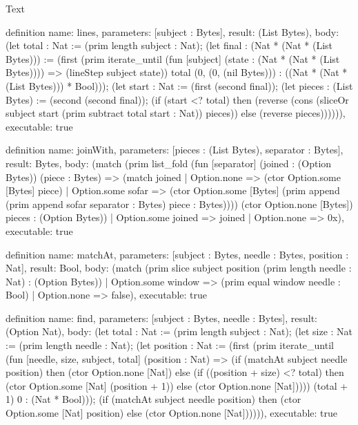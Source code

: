 \begin{lexlean}{Text}
\begin{semanticmodule}
definition{
  name: lines,
  parameters: [subject : Bytes],
  result: (List Bytes),
  body: (let total : Nat := (prim length subject : Nat); (let final : (Nat * (Nat * (List Bytes))) := (first (prim iterate_until (fun [subject] (state : (Nat * (Nat * (List Bytes)))) => (lineStep subject state)) total (0, (0, (nil Bytes))) : ((Nat * (Nat * (List Bytes))) * Bool))); (let start : Nat := (first (second final)); (let pieces : (List Bytes) := (second (second final)); (if (start <? total) then (reverse (cons (sliceOr subject start (prim subtract total start : Nat)) pieces)) else (reverse pieces)))))),
  executable: true
}

definition{
  name: joinWith,
  parameters: [pieces : (List Bytes), separator : Bytes],
  result: Bytes,
  body: (match (prim list_fold (fun [separator] (joined : (Option Bytes)) (piece : Bytes) => (match joined
      | Option.none => (ctor Option.some [Bytes] piece)
      | Option.some sofar => (ctor Option.some [Bytes] (prim append (prim append sofar separator : Bytes) piece : Bytes)))) (ctor Option.none [Bytes]) pieces : (Option Bytes))
    | Option.some joined => joined
    | Option.none => 0x),
  executable: true
}

definition{
  name: matchAt,
  parameters: [subject : Bytes, needle : Bytes, position : Nat],
  result: Bool,
  body: (match (prim slice subject position (prim length needle : Nat) : (Option Bytes))
    | Option.some window => (prim equal window needle : Bool)
    | Option.none => false),
  executable: true
}

definition{
  name: find,
  parameters: [subject : Bytes, needle : Bytes],
  result: (Option Nat),
  body: (let total : Nat := (prim length subject : Nat); (let size : Nat := (prim length needle : Nat); (let position : Nat := (first (prim iterate_until (fun [needle, size, subject, total] (position : Nat) => (if (matchAt subject needle position) then (ctor Option.none [Nat]) else (if ((position + size) <? total) then (ctor Option.some [Nat] (position + 1)) else (ctor Option.none [Nat])))) (total + 1) 0 : (Nat * Bool))); (if (matchAt subject needle position) then (ctor Option.some [Nat] position) else (ctor Option.none [Nat]))))),
  executable: true
}
\end{semanticmodule}
\end{lexlean}
